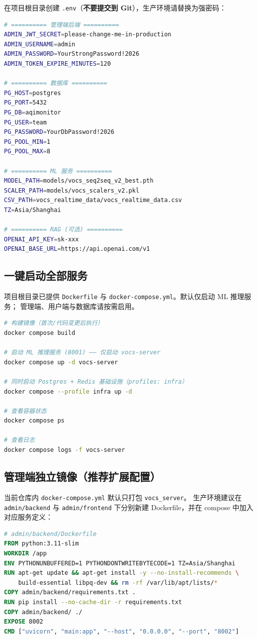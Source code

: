 \documentclass[UTF8,a4paper,11pt]{ctexart}
\begin{document}
在项目根目录创建 \texttt{.env}（\textbf{不要提交到 Git}），生产环境请替换为强密码：

\begin{lstlisting}[language=bash]
# ========== 管理端后端 ==========
ADMIN_JWT_SECRET=please-change-me-in-production
ADMIN_USERNAME=admin
ADMIN_PASSWORD=YourStrongPassword!2026
ADMIN_TOKEN_EXPIRE_MINUTES=120

# ========== 数据库 ==========
PG_HOST=postgres
PG_PORT=5432
PG_DB=aqimonitor
PG_USER=team
PG_PASSWORD=YourDbPassword!2026
PG_POOL_MIN=1
PG_POOL_MAX=8

# ========== ML 服务 ==========
MODEL_PATH=models/vocs_seq2seq_v2_best.pth
SCALER_PATH=models/vocs_scalers_v2.pkl
CSV_PATH=vocs_realtime_data/vocs_realtime_data.csv
TZ=Asia/Shanghai

# ========== RAG (可选) ==========
OPENAI_API_KEY=sk-xxx
OPENAI_BASE_URL=https://api.openai.com/v1
\end{lstlisting}

\subsection{一键启动全部服务}

项目根目录已提供 \texttt{Dockerfile} 与 \texttt{docker-compose.yml}。默认仅启动 ML 推理服务；
管理端、用户端与数据库请按需启用。

\begin{lstlisting}[language=bash]
# 构建镜像（首次/代码变更后执行）
docker compose build

# 启动 ML 推理服务 (8001) —— 仅启动 vocs-server
docker compose up -d vocs-server

# 同时启动 Postgres + Redis 基础设施（profiles: infra）
docker compose --profile infra up -d

# 查看容器状态
docker compose ps

# 查看日志
docker compose logs -f vocs-server
\end{lstlisting}

\subsection{管理端独立镜像（推荐扩展配置）}

当前仓库内 \texttt{docker-compose.yml} 默认只打包 \texttt{vocs\_server}。
生产环境建议在 \texttt{admin/backend} 与 \texttt{admin/frontend} 下分别新建 Dockerfile，并在
compose 中加入对应服务定义：

\begin{lstlisting}[language=dockerfile]
# admin/backend/Dockerfile
FROM python:3.11-slim
WORKDIR /app
ENV PYTHONUNBUFFERED=1 PYTHONDONTWRITEBYTECODE=1 TZ=Asia/Shanghai
RUN apt-get update && apt-get install -y --no-install-recommends \
    build-essential libpq-dev && rm -rf /var/lib/apt/lists/*
COPY admin/backend/requirements.txt .
RUN pip install --no-cache-dir -r requirements.txt
COPY admin/backend/ ./
EXPOSE 8002
CMD ["uvicorn", "main:app", "--host", "0.0.0.0", "--port", "8002"]
\end{lstlisting}
\end{document}
